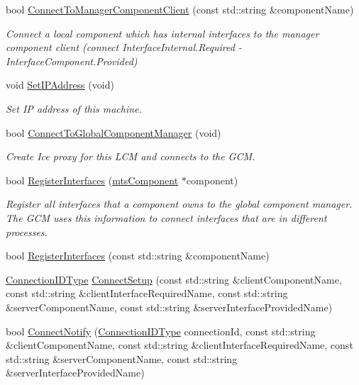 \begin{DoxyCompactItemize}
bool \hyperlink{classmts_manager_local_a4750d522e6afe31cfc94684a64ae8ee5}{Connect\-To\-Manager\-Component\-Client} (const std\-::string \&component\-Name)
\begin{DoxyCompactList}\small\item\em Connect a local component which has internal interfaces to the manager component client (connect Interface\-Internal.\-Required -\/ Interface\-Component.\-Provided) \end{DoxyCompactList}\item 
void \hyperlink{classmts_manager_local_ac5e9cb62f53cfc364edb0c999fe49d54}{Set\-I\-P\-Address} (void)
\begin{DoxyCompactList}\small\item\em Set I\-P address of this machine. \end{DoxyCompactList}\item 
bool \hyperlink{classmts_manager_local_add2522aee0e994165df72ae49b624b18}{Connect\-To\-Global\-Component\-Manager} (void)
\begin{DoxyCompactList}\small\item\em Create Ice proxy for this L\-C\-M and connects to the G\-C\-M. \end{DoxyCompactList}\item 
bool \hyperlink{classmts_manager_local_a834b6553cb68326d1a10d60d79a91c9e}{Register\-Interfaces} (\hyperlink{classmts_component}{mts\-Component} $\ast$component)
\begin{DoxyCompactList}\small\item\em Register all interfaces that a component owns to the global component manager. The G\-C\-M uses this information to connect interfaces that are in different processes. \end{DoxyCompactList}\item 
bool \hyperlink{classmts_manager_local_ae41a7d305a650e91aa860cb920c2c6e9}{Register\-Interfaces} (const std\-::string \&component\-Name)
\item 
\hyperlink{mts_forward_declarations_8h_ad3543bb11742e1766374ec96016d6547}{Connection\-I\-D\-Type} \hyperlink{classmts_manager_local_acf35d5793cce2d5900d3918ec03bde52}{Connect\-Setup} (const std\-::string \&client\-Component\-Name, const std\-::string \&client\-Interface\-Required\-Name, const std\-::string \&server\-Component\-Name, const std\-::string \&server\-Interface\-Provided\-Name)
\item 
bool \hyperlink{classmts_manager_local_a351f42adc9a2e22cc0a0b2af12c15fe6}{Connect\-Notify} (\hyperlink{mts_forward_declarations_8h_ad3543bb11742e1766374ec96016d6547}{Connection\-I\-D\-Type} connection\-Id, const std\-::string \&client\-Component\-Name, const std\-::string \&client\-Interface\-Required\-Name, const std\-::string \&server\-Component\-Name, const std\-::string \&server\-Interface\-Provided\-Name)

\end{DoxyCompactItemize}
